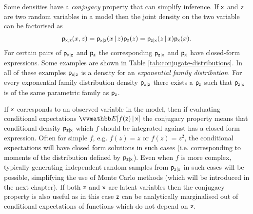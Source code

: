 Some densities have a \emph{conjugacy} property that can simplify inference. If $\mathsf{x}$ and $\mathsf{z}$ are two random variables in a model then the joint density on the two variable can be factorised as
\begin{equation}\label{eq:conjugate-factorisation}
  \mathsf{p}_{\mathsf{x},\mathsf{z}}(x,z) =
  \mathsf{p}_{\mathsf{x}|\mathsf{z}}(x\operatorname{|} z)\mathsf{p}_{\mathsf{z}}(z) =
  \mathsf{p}_{\mathsf{z}|\mathsf{x}}(z\operatorname{|} x)\mathsf{p}_{\mathsf{x}}(x).
\end{equation}
For certain pairs of $\mathsf{p}_{\mathsf{x}|\mathsf{z}}$ and $\mathsf{p}_{\mathsf{z}}$ the corresponding $\mathsf{p}_{\mathsf{z}|\mathsf{x}}$ and $\mathsf{p}_{\mathsf{x}}$ have closed-form expressions. Some examples are shown in Table \ref{tab:conjugate-distributions}. In all of these examples $\mathsf{p}_{\mathsf{x}|\mathsf{z}}$ is a density for an \emph{exponential family distribution}. For every exponential family distribution density $\mathsf{p}_{\mathsf{x}|\mathsf{z}}$ there exists a $\mathsf{p}_{\mathsf{z}}$ such that $\mathsf{p}_{\mathsf{z}|\mathsf{x}}$ is of the same parametric family as $\mathsf{p}_{\mathsf{z}}$.

If $\mathsf{x}$ corresponds to an observed variable in the model, then if evaluating conditional expectations $\expc{f(\rvar{z}) \gvn \rvar{x}}$ the conjugacy property means that conditional density $\mathsf{p}_{\mathsf{z}|\mathsf{x}}$ which $f$ should be integrated against has a closed form expression. Often for simple $f$, e.g. $f(z) = z$ or $f(z) = z^2$, the conditional expectations will have closed form solutions in such cases (i.e. corresponding to moments of the distribution defined by $\mathsf{p}_{\mathsf{z}|\mathsf{x}}$). Even when $f$ is more complex, typically generating independent random samples from $\mathsf{p}_{\mathsf{z}|\mathsf{x}}$ in such cases will be possible, simplifying the use of Monte Carlo methods (which will be introduced in the next chapter). If both $\mathsf{z}$ and $\mathsf{x}$ are latent variables then the conjugacy property is also useful as in this case $\mathsf{z}$ can be analytically marginalised out of conditional expectations of functions which do not depend on $\mathsf{z}$.

